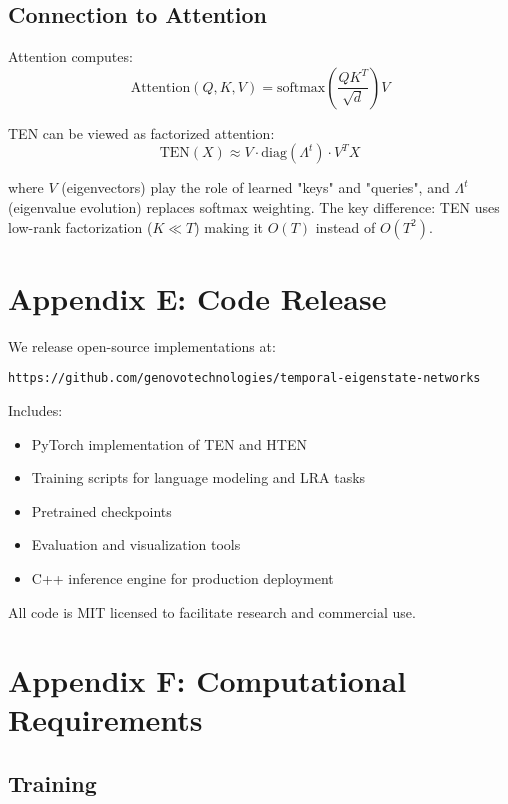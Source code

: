 \documentclass[11pt,letterpaper]{article}
\begin{document}
\subsection{Connection to Attention}

Attention computes:
\begin{equation}
    \text{Attention}(Q,K,V) = \text{softmax}\left(\frac{QK^T}{\sqrt{d}}\right)V
\end{equation}

TEN can be viewed as factorized attention:
\begin{equation}
    \text{TEN}(X) \approx V \cdot \text{diag}(\Lambda^t) \cdot V^T X
\end{equation}

where $V$ (eigenvectors) play the role of learned "keys" and "queries", and $\Lambda^t$ (eigenvalue evolution) replaces softmax weighting. The key difference: TEN uses low-rank factorization ($K \ll T$) making it $O(T)$ instead of $O(T^2)$.

\section{Appendix E: Code Release}

We release open-source implementations at:

\texttt{https://github.com/genovotechnologies/temporal-eigenstate-networks}

Includes:
\begin{itemize}
    \item PyTorch implementation of TEN and HTEN
    \item Training scripts for language modeling and LRA tasks
    \item Pretrained checkpoints
    \item Evaluation and visualization tools
    \item C++ inference engine for production deployment
\end{itemize}

All code is MIT licensed to facilitate research and commercial use.

\section{Appendix F: Computational Requirements}

\subsection{Training}
\end{document}
